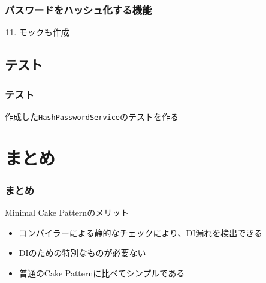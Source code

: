 \begin{frame}
  \frametitle{パスワードをハッシュ化する機能}

  \begin{enumerate}
    \setcounter{enumi}{10}
    \item<1-> モックも作成
      
      \begin{center}
      \end{center}
  \end{enumerate}
\end{frame}

\subsection{テスト}

\begin{frame}
  \frametitle{テスト}

  作成した\texttt{HashPasswordService}のテストを作る
   {
    
  }
  
  \begin{center}
  \end{center}
\end{frame}

\section{まとめ}

\begin{frame}
  \frametitle{まとめ}
  
  \begin{block}{Minimal Cake Patternのメリット}
    \begin{itemize}
      \item<2-> コンパイラーによる静的なチェックにより、DI漏れを検出できる
      \item<3-> DIのための特別なものが必要ない
      \item<4-> 普通のCake Patternに比べてシンプルである
    \end{itemize}
  \end{block}
\end{frame}

